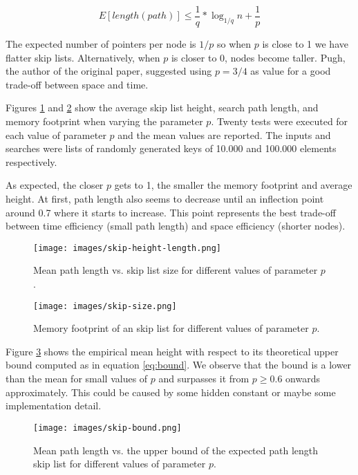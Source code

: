 \documentclass[a4paper,10pt,table,xcdraw]{article}
\begin{document}
\begin{equation} \label{eq:bound}
E[length(path)] \leq \frac{1}{q} * \log_{1/q} n + \frac{1}{p}
\end{equation}

The expected number of pointers per node is $1/p$ so when $p$ is close to 1 we have flatter skip lists. Alternatively, when $p$ is closer to 0, nodes become taller. Pugh, the author of the original paper, suggested using $p = 3/4$ as value for a good trade-off between space and time. 

\label{test-sl}
Figures \ref{fig:skip-height} and \ref{fig:skip-size} show the average skip list height, search path length, and memory footprint when varying the parameter $p$. Twenty tests were executed for each value of parameter $p$ and the mean values are reported. The inputs and searches were lists of randomly generated keys of 10.000 and 100.000 elements respectively. 

As expected, the closer $p$ gets to 1, the smaller the memory footprint and average height. At first, path length also seems to decrease until an inflection point around 0.7 where it starts to increase. This point represents the best trade-off between time efficiency (small path length) and space efficiency (shorter nodes).

\begin{figure}[H]
\centering
\texttt{[image: images/skip-height-length.png]}
\caption{Mean path length vs. skip list size for different values of parameter $p$.}
\label{fig:skip-height}
\end{figure}

\begin{figure}[H]
\centering
\texttt{[image: images/skip-size.png]}
\caption{Memory footprint of an skip list for different values of parameter $p$.}
\label{fig:skip-size}
\end{figure}

Figure \ref{fig:skip-bound} shows the empirical mean height with respect to its theoretical upper bound computed as in equation \ref{eq:bound}. We observe that the bound is a lower than the mean for small values of $p$ and surpasses it from $p \geq 0.6$ onwards approximately. This could be caused by some hidden constant or maybe some implementation detail.



\begin{figure}[H]
\centering
\texttt{[image: images/skip-bound.png]}
\caption{Mean path length vs. the upper bound of the expected path length skip list for different values of parameter $p$.}
\label{fig:skip-bound}
\end{figure}
\end{document}
